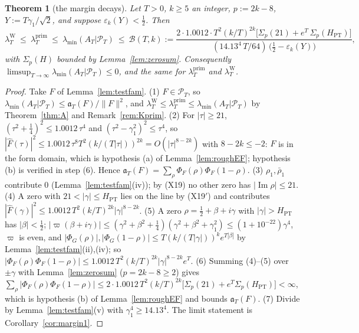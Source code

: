 \documentclass[11pt]{amsart}
\newtheorem{theorem}{Theorem}[section]
\theoremstyle{definition}
\theoremstyle{remark}
\newcommand{\Iml}{\operatorname{Im}}
\newcommand{\PT}{\mathcal P_T}
\newcommand{\lamP}{\lambda^{\mathrm{prim}}_T}
\newcommand{\lamW}{\lambda^{\mathrm W}_T}
\newcommand{\lamA}{\lambda_{\min}(A_T|\PT)}
\newcommand{\Fh}{\widehat F}
\begin{document}
\begin{theorem}[the margin decays]\label{thm:margin}
Let $T>0$, $k\ge5$ an integer, $p:=2k-8$, $Y:=T\gamma_1/\sqrt2$, and suppose $\varepsilon_k(Y)<\frac12$. Then
\begin{equation}\label{eq:Bmargin}
\lamW\ \le\ \lamP\ \le\ \lamA\ \le\ \mathcal B(T,k):=
\frac{2\cdot1.0012\cdot T^2(k/T)^{2k}\big[\Sigma_p(21)+e^T\,\Sigma_p(H_{\mathrm{PT}})\big]}
{(14.13^4\,T/64)\,\big(\frac12-\varepsilon_k(Y)\big)},
\end{equation}
with $\Sigma_p(H)$ bounded by Lemma~\ref{lem:zerosum}. Consequently $\limsup_{T\to\infty}\lamA\le0$, and the
same for $\lamP$ and $\lamW$.
\end{theorem}
\begin{proof}
Take $F$ of Lemma~\ref{lem:testfam}. (1) $F\in\PT$, so $\lamA\le\mathfrak a_T(F)/\|F\|^2$, and
$\lamW\le\lamP\le\lamA$ by Theorem~\ref{thm:A} and Remark~\ref{rem:Kprim}.
(2) For $|\tau|\ge21$, $(\tau^2+\frac14)^2\le1.0012\,\tau^4$ and $(\tau^2-\gamma_1^2)^2\le\tau^4$, so
$|\Fh(\tau)|^2\le1.0012\,\tau^8T^2(k/(T|\tau|))^{2k}=O(|\tau|^{8-2k})$ with $8-2k\le-2$: $F$ is in the
form domain, which is hypothesis (a) of Lemma~\ref{lem:roughEF}; hypothesis (b) is verified in step (6).
Hence $\mathfrak a_T(F)=\sum_\rho\Phi_F(\rho)\Phi_F(1-\rho)$.
(3) $\rho_1,\bar\rho_1$ contribute $0$ (Lemma~\ref{lem:testfam}(iv)); by (X19) no other zero has $|\Iml\rho|\le21$.
(4) A zero with $21<|\gamma|\le H_{\mathrm{PT}}$ lies on the line by (X19$'$) and contributes
$|\Fh(\gamma)|^2\le1.0012\,T^2(k/T)^{2k}|\gamma|^{8-2k}$.
(5) A zero $\rho=\frac12+\beta+i\gamma$ with $|\gamma|>H_{\mathrm{PT}}$ has $|\beta|<\frac12$;
$|\varpi(\beta+i\gamma)|\le(\gamma^2+\beta^2+\frac14)(\gamma^2+\beta^2+\gamma_1^2)\le(1+10^{-22})\gamma^4$, $\varpi$ is even,
and $|\Phi_G(\rho)|,|\Phi_G(1-\rho)|\le T(k/(T|\gamma|))^ke^{T|\beta|}$ by Lemma~\ref{lem:testfam}(ii),(iv);
so $|\Phi_F(\rho)\Phi_F(1-\rho)|\le1.0012\,T^2(k/T)^{2k}|\gamma|^{8-2k}e^T$.
(6) Summing (4)--(5) over $\pm\gamma$ with Lemma~\ref{lem:zerosum} ($p=2k-8\ge2$) gives
$\sum_\rho|\Phi_F(\rho)\Phi_F(1-\rho)|\le2\cdot1.0012\,T^2(k/T)^{2k}\big[\Sigma_p(21)+e^T\Sigma_p(H_{\mathrm{PT}})\big]<\infty$,
which is hypothesis (b) of Lemma~\ref{lem:roughEF} and bounds $\mathfrak a_T(F)$.
(7) Divide by Lemma~\ref{lem:testfam}(v) with $\gamma_1^4\ge14.13^4$. The limit statement is
Corollary~\ref{cor:margin1}.
\end{proof}
\end{document}
